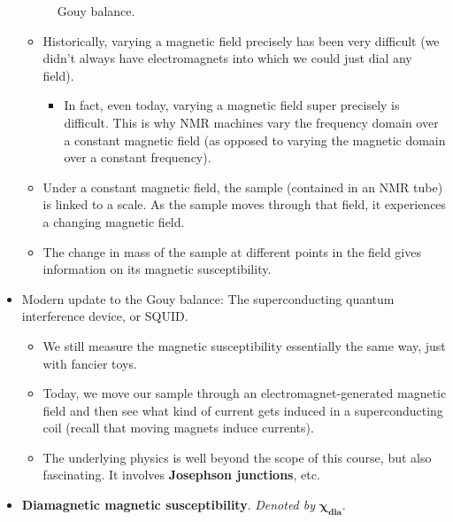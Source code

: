 \documentclass[../notes.tex]{subfiles}
\begin{document}
\begin{itemize}
\begin{figure}[h!]
        \caption{Gouy balance.}
        \label{fig:Gouy}
    \end{figure}
    \begin{itemize}
        \item Historically, varying a magnetic field precisely has been very difficult (we didn't always have electromagnets into which we could just dial any field).
        \begin{itemize}
            \item In fact, even today, varying a magnetic field super precisely is difficult. This is why NMR machines vary the frequency domain over a constant magnetic field (as opposed to varying the magnetic domain over a constant frequency).
        \end{itemize}
        \item Under a constant magnetic field, the sample (contained in an NMR tube) is linked to a scale. As the sample moves through that field, it experiences a changing magnetic field.
        \item The change in mass of the sample at different points in the field gives information on its magnetic susceptibility.
    \end{itemize}
    \item Modern update to the Gouy balance: The superconducting quantum interference device, or SQUID.
    \begin{itemize}
        \item We still measure the magnetic susceptibility essentially the same way, just with fancier toys.
        \item Today, we move our sample through an electromagnet-generated magnetic field and then see what kind of current gets induced in a superconducting coil (recall that moving magnets induce currents).
        \item The underlying physics is well beyond the scope of this course, but also fascinating. It involves \textbf{Josephson junctions}, etc.
    \end{itemize}
    \item \textbf{Diamagnetic magnetic susceptibility}. \emph{Denoted by} $\bm{\chi_\textbf{dia}}$.

\end{itemize}
\end{document}

